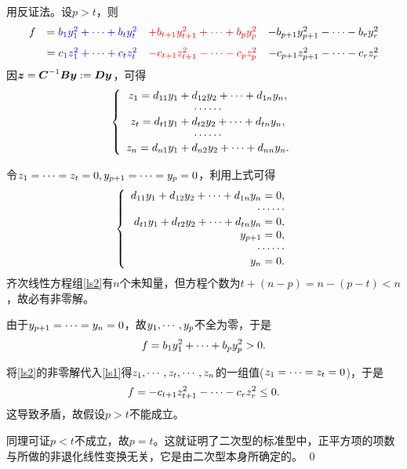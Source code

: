 \begin{frame}
  用反证法。设$p>t$，则
  $$
  \begin{array}{rrrr}
    f&=\textcolor{blue}{b_1y_1^2+\cdots+b_ty_t^2}&\textcolor{red}{+b_{t+1}y_{t+1}^2+\cdots+b_py_p^2}&-b_{p+1}y_{p+1}^2-\cdots-b_{r}y_r^2\\[.1in]
     &=\textcolor{blue}{c_1z_1^2+\cdots+c_tz_t^2}&\textcolor{red}{-c_{t+1}z_{t+1}^2-\cdots-c_pz_p^2}&-c_{p+1}z_{p+1}^2-\cdots-c_{r}z_r^2
  \end{array}
  $$
  因${\boldsymbol{z}} = \boldsymbol{C}^{-1}\boldsymbol{B}{\boldsymbol{y}} := \boldsymbol{D} {\boldsymbol{y}}$，可得
  \begin{equation}\label{ls1}
  \left\{
    \begin{array}{c}
      z_1 = d_{11}y_1+d_{12}y_2+\cdots+d_{1n}y_n, \\
      \cdots\cdots\\
      z_t = d_{t1}y_1+d_{t2}y_2+\cdots+d_{tn}y_n, \\
      \cdots\cdots\\
      z_n = d_{n1}y_1+d_{n2}y_2+\cdots+d_{nn}y_n.
    \end{array}
  \right.
  \end{equation}
  \pause 

  令$z_1=\cdots=z_t=0, y_{p+1}=\cdots=y_p=0$，利用上式可得
  \begin{equation}\label{ls2}
  \left\{
    \begin{array}{r}
      d_{11}y_1+d_{12}y_2+\cdots+d_{1n}y_n=0, \\
      \cdots\cdots\\
      d_{t1}y_1+d_{t2}y_2+\cdots+d_{tn}y_n=0, \\
      y_{p+1}=0, \\
      \cdots\cdots\\
      y_n=0.
    \end{array}
  \right.
  \end{equation}
  齐次线性方程组\eqref{ls2}有$n$个未知量，但方程个数为$t+(n-p)=n-(p-t)<n$，故必有非零解。
\end{frame}

\begin{frame}
  由于$y_{p+1}=\cdots=y_n=0$，故$y_1,\cdots,y_p$不全为零，于是
  $$
  f=b_1y_1^2+\cdots+b_py_p^2>0.
  $$
  \pause 

  将\eqref{ls2}的非零解代入\eqref{ls1}得$z_1,\cdots,z_t,\cdots,z_n$的一组值($z_1=\cdots=z_t=0$)，于是
  $$
  f=-c_{t+1}z_{t+1}^2-\cdots-c_{r}z_r^2\le 0.
  $$
  这导致矛盾，故假设$p>t$不能成立。
  \pause 

  同理可证$p<t$不成立，故$p=t$。这就证明了二次型的标准型中，正平方项的项数与所做的非退化线性变换无关，它是由二次型本身所确定的。 \qed
\end{frame}

